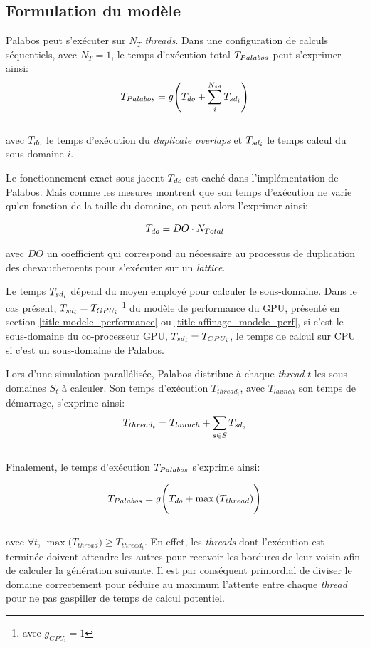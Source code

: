 \subsection{Formulation du modèle}

Palabos peut s'exécuter sur $N_T$ \textit{threads}. Dans une configuration de calculs séquentiels, avec $N_T=1$, le temps d'exécution total $T_{Palabos} $ peut s'exprimer ainsi:
\begin{equation}
T_{Palabos} = g \Bigg(T_{do} + \sum_{i}^{N_{sd}} T_{sd_i} \Bigg) 
\end{equation}\\[-\baselineskip]

avec $T_{do}$ le temps d'exécution du \textit{duplicate overlaps} et $T_{sd_i}$ le temps calcul du sous-domaine $i$.

Le fonctionnement exact sous-jacent $T_{do}$ est caché dans l'implémentation de Palabos. Mais comme les mesures montrent que son temps d'exécution ne varie qu'en fonction de la taille du domaine, on peut alors l'exprimer ainsi:\\

\newcommand{\docoef}[0]{DO}

\begin{equation}
\Time_{do}  = \docoef \cdot N_{Total}
\end{equation}

avec $\docoef$ un coefficient qui correspond au nécessaire au processus de duplication des chevauchements pour s'exécuter sur un \textit{lattice}.

Le temps $T_{sd_i}$ dépend du moyen employé pour calculer le sous-domaine. Dans le cas présent, $T_{sd_i} = T_{GPU_i}$ \footnote{avec $g_{GPU_i}=1$} du modèle de performance du \acs{GPU}, présenté en section \ref{title-modele_performance} ou \ref{title-affinage_modele_perf}, si c'est le sous-domaine du co-processeur \acs{GPU},  $T_{sd_i} = T_{CPU_i}$, le temps de calcul sur \acs{CPU} si c'est un sous-domaine de Palabos.

Lors d'une simulation parallélisée, Palabos distribue à chaque \textit{thread} $t$ les sous-domaines $S_t$ à calculer. Son temps d'exécution $T_{thread_t}$, avec $T_{launch}$ son temps de démarrage, s'exprime ainsi:
\begin{equation}
T_{thread_t} =  T_{launch} + \sum_{s\in S} T_{sd_s} 
\end{equation}\\[-\baselineskip]

Finalement, le temps d'exécution $T_{Palabos}$ s'exprime ainsi:

\begin{equation}
T_{Palabos} =   g \Bigg(T_{do} + \max{(T_{thread}}) \Bigg)
\end{equation}\\[-\baselineskip]

avec $\forall t$,  $\max{(T_{thread}}) \ge T_{thread_t}$. En effet, les \textit{threads} dont l'exécution est terminée doivent attendre les autres pour recevoir les bordures de leur voisin afin de calculer la génération suivante. Il est par conséquent primordial de diviser le domaine correctement pour réduire au maximum l'attente entre chaque \textit{thread} pour ne pas gaspiller de temps de calcul potentiel.